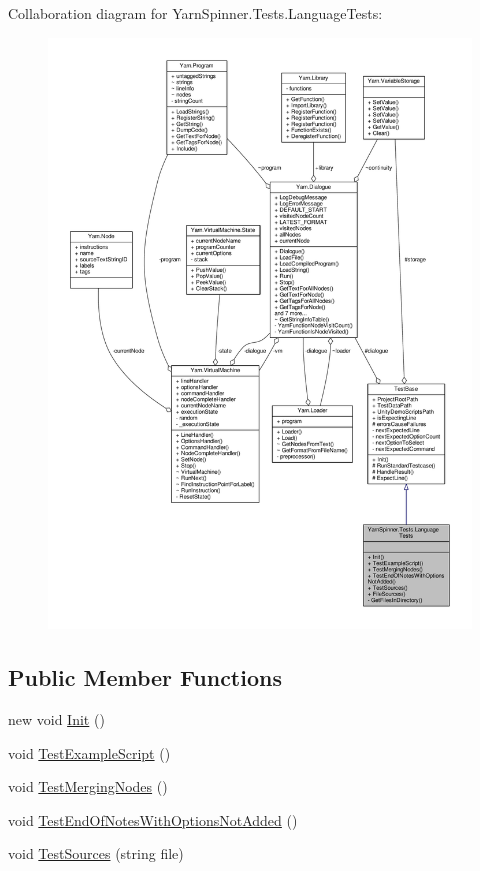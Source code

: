 Collaboration diagram for Yarn\-Spinner.\-Tests.\-Language\-Tests\-:
\nopagebreak
\begin{figure}[H]
\begin{center}
\leavevmode
\includegraphics[width=350pt]{a00729}
\end{center}
\end{figure}
\subsection*{Public Member Functions}
\begin{DoxyCompactItemize}
\item 
new void \hyperlink{a00122_ae0d1fb752df07e24b0d11db25e0c17c4}{Init} ()
\item 
void \hyperlink{a00122_a1d044fd44e610a35ef09d486eb06ee37}{Test\-Example\-Script} ()
\item 
void \hyperlink{a00122_a4da987e2dbc65b35cc6bd07392f71453}{Test\-Merging\-Nodes} ()
\item 
void \hyperlink{a00122_a6cc57344745b5fb315abdeacdd23b659}{Test\-End\-Of\-Notes\-With\-Options\-Not\-Added} ()
\item 
void \hyperlink{a00122_a1fb5f217de912475860fcde067418f83}{Test\-Sources} (string file)
\end{DoxyCompactItemize}
